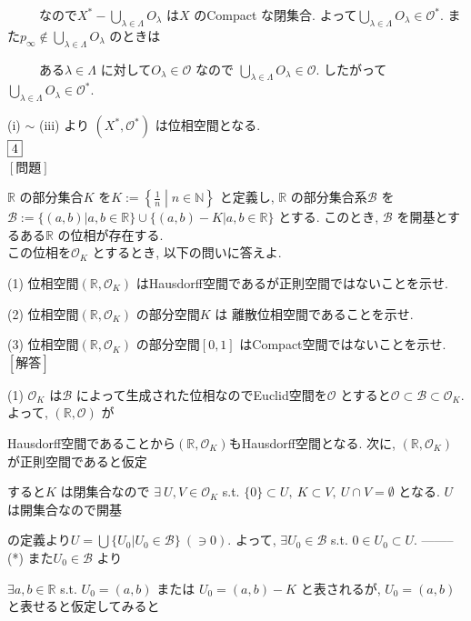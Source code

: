 \documentclass{jsarticle}
\begin{document}
\ \ \ \ \ なので$X^* - \displaystyle \bigcup_{\lambda \in \Lambda} O_{\lambda}$ は$X$ のCompact な閉集合. よって$\displaystyle \bigcup_{\lambda \in \Lambda} O_\lambda \in \mathcal{O}^*$. また$p_\infty \notin \displaystyle \bigcup_{\lambda \in \Lambda} O_{\lambda}$ のときは

\ \ \ \ \ ある$\lambda \in \Lambda$ に対して$O_\lambda \in \mathcal{O}$ なので $\displaystyle \bigcup_{\lambda \in \Lambda} O_\lambda \in \mathcal{O}$. したがって$\displaystyle \bigcup_{\lambda \in \Lambda} O_\lambda \in \mathcal{O}^*$.

(i) $\sim$ (iii) より $(X^*, \mathcal{O}^*)$ は位相空間となる. \\
$\fbox{4}$ \\
$[\textbf{問題}]$

$\mathbb{R}$ の部分集合$K$ を$K := \left\{\displaystyle \frac{1}{n} \middle | n \in \mathbb{N} \right\}$ と定義し, $\mathbb{R}$ の部分集合系$\mathcal{B}$ を$\mathcal{B} := \{(a,b) | a,b \in \mathbb{R}\} \cup \{(a,b) - K | a,b \in \mathbb{R}\}$ とする. このとき, $\mathcal{B}$ を開基とするある$\mathbb{R}$ の位相が存在する. \\
この位相を$\mathcal{O}_K$ とするとき, 以下の問いに答えよ.

(1) 位相空間$(\mathbb{R}, \mathcal{O}_K)$ はHausdorff空間であるが正則空間ではないことを示せ.

(2) 位相空間$(\mathbb{R}, \mathcal{O}_K)$ の部分空間$K$ は 離散位相空間であることを示せ.

(3) 位相空間$(\mathbb{R}, \mathcal{O}_K)$ の部分空間$[0,1]$ はCompact空間ではないことを示せ. \\
$[\textbf{解答}]$

(1) $\mathcal{O}_K$ は$\mathcal{B}$ によって生成された位相なのでEuclid空間を$\mathcal{O}$ とすると$\mathcal{O} \subset \mathcal{B} \subset \mathcal{O}_K$. よって, $(\mathbb{R}, \mathcal{O})$ が

Hausdorff空間であることから$(\mathbb{R}, \mathcal{O}_K)$もHausdorff空間となる. 次に, $(\mathbb{R}, \mathcal{O}_K)$ が正則空間であると仮定

すると$K$ は閉集合なので $\exists \ U, V \in \mathcal{O}_K$ s.t. $\{0\} \subset U, \ K \subset V, \ U \cap V = \emptyset$ となる. $U$ は開集合なので開基

の定義より$U = \bigcup \{U_0 | U_0 \in \mathcal{B}\} \ (\ni 0)$. よって, $\exists U_0 \in \mathcal{B}$ s.t. $0 \in U_0 \subset U$. --------(*) また$U_0 \in \mathcal{B}$ より

$\exists a,b \in \mathbb{R}$ s.t. $U_0 = (a,b)$ または $U_0 = (a,b) - K$ と表されるが, $U_0 = (a,b)$ と表せると仮定してみると
\end{document}
